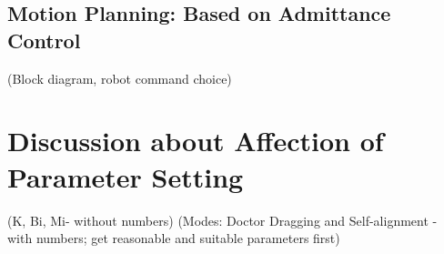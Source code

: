 \subsection{Motion Planning: Based on Admittance Control}
(Block diagram, robot command choice)
\section{Discussion about Affection of Parameter Setting}
\label{sec:affection}
(K, Bi, Mi- without numbers)
(Modes: Doctor Dragging and Self-alignment - with numbers; get reasonable and suitable parameters first)